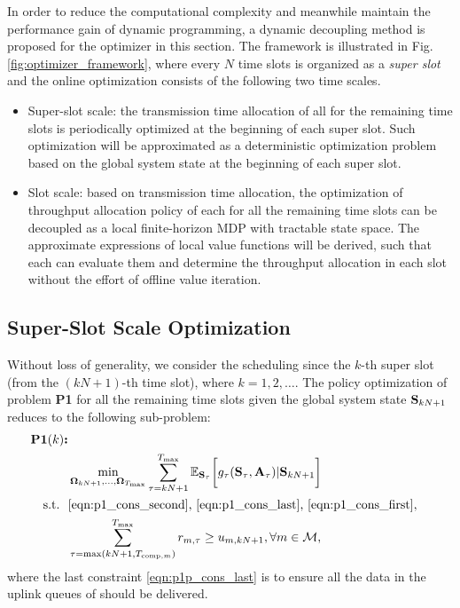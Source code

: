 In order to reduce the computational complexity and meanwhile maintain the performance gain of dynamic programming, a dynamic decoupling method is proposed for the {\fwName} optimizer in this section. The framework is illustrated in Fig. \ref{fig:optimizer_framework}, where every $N$ time slots is organized as a {\it super slot} and the online optimization consists of the following two time scales.
\begin{itemize}
    \item Super-slot scale: the transmission time allocation of all {\IAVs} for the remaining time slots is periodically optimized at the beginning of each super slot. Such optimization will be approximated as a deterministic optimization problem based on the global system state at the beginning of each super slot.
    \item Slot scale: based on transmission time allocation, the optimization of throughput allocation policy of each {\IAV} for all the remaining time slots can be decoupled as a local finite-horizon MDP with tractable state space. The approximate expressions of local value functions will be derived, such that each {\IAV} can evaluate them and determine the throughput allocation in each slot without the effort of offline value iteration.
\end{itemize}

\subsection{Super-Slot Scale Optimization}
Without loss of generality, we consider the scheduling since the $k$-th super slot (from the $(kN+1)$-th time slot), where $k=1,2,\dots$. The policy optimization of problem {\bf P1} for all the remaining time slots given the global system state $\mathbf{S}_{kN+1}$ reduces to the following sub-problem:
\begin{align}
    \textbf{P1$(k)$:}
    \nonumber\\ 
    &\min_{ \boldsymbol{\Omega}_{kN+1}, \dots, \boldsymbol{\Omega}_{T_{\max}} }
        \sum_{\tau=kN+1}^{{T_{\max}}}  \mathbb{E}_{\mathbf{S}_{\tau}} \bigg[
            g_{\tau}( \mathbf{S}_{\tau}, \mathbf{A}_{\tau} ) | \mathbf{S}_{kN+1}
        \bigg] \nonumber
    \\ \nonumber
    \text{s.t.~~} &\text{\eqref{eqn:p1_cons_second}, \eqref{eqn:p1_cons_last}, \eqref{eqn:p1_cons_first}},
    \\
    & \sum_{ \tau=\max(kN+1,T_{\text{comp},m}) }^{ {T_{\max}} } r_{m,\tau} \geq {u}_{m,kN+1}, \forall m\in\mathcal{M},
    \label{eqn:p1p_cons_last}
\end{align}
where the last constraint \eqref{eqn:p1p_cons_last} is to ensure all the data in the uplink queues of {\IAVs} should be delivered.


